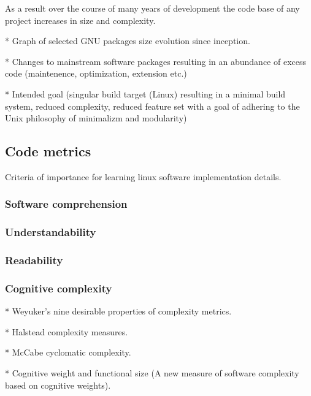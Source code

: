 As a result over the course of many years of development the code base of any project increases in size and complexity.

* Graph of selected GNU packages size evolution since inception.

* Changes to mainstream software packages resulting in an abundance of excess code (maintenence, optimization, extension etc.)

* Intended goal (singular build target (Linux) resulting in a minimal build system, reduced complexity, reduced feature set with a goal of adhering to the Unix philosophy of minimalizm and modularity)

\subsection{Code metrics}

Criteria of importance for learning linux software implementation details.

\subsubsection{Software comprehension}

\subsubsection{Understandability}

\subsubsection{Readability}

\subsubsection{Cognitive complexity}

* Weyuker's nine desirable properties of complexity metrics.

* Halstead complexity measures.

* McCabe cyclomatic complexity.

* Cognitive weight and functional size (A new measure of software complexity based on cognitive weights).
